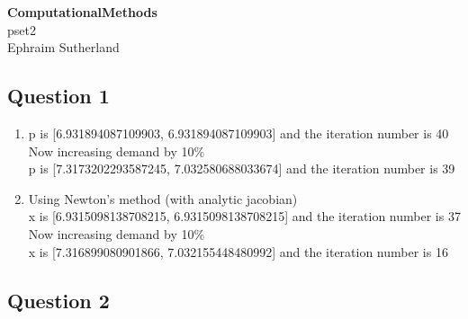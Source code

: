 \documentclass[12pt]{article}
\begin{document}
\begin{center}
{\large \bf ComputationalMethods }   \\ \large pset2 \\ Ephraim Sutherland
\end{center}

\subsection*{Question 1}

\begin{enumerate}

\item 
p is [6.931894087109903, 6.931894087109903] and the iteration number is 40 \\ 
Now increasing demand by 10\% \\
p is [7.3173202293587245, 7.032580688033674] and the iteration number is 39

\item 
	Using Newton's method (with analytic jacobian) \\ 
x is [6.9315098138708215, 6.9315098138708215] and the iteration number is 37 \\ 
Now increasing demand by 10\% \\ 
x is [7.316899080901866, 7.032155448480992] and the iteration number is 16 \\


\end{enumerate} 

\subsection*{Question 2}
\end{document}
